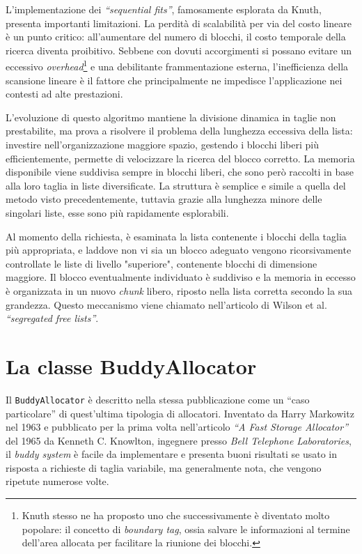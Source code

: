 L'implementazione dei \textit{“sequential fits”}, famosamente esplorata da Knuth, presenta importanti limitazioni. La perdità di scalabilità per via del costo lineare è un punto critico: all’aumentare del numero di blocchi, il costo temporale della ricerca diventa proibitivo. Sebbene con dovuti accorgimenti si possano evitare un eccessivo \textit{overhead}\footnote{Knuth stesso ne ha proposto uno che successivamente è diventato molto popolare: il concetto di \textit{boundary tag}, ossia salvare le informazioni al termine dell'area allocata per facilitare la riunione dei blocchi.} e una debilitante frammentazione esterna, l’inefficienza della scansione lineare è il fattore che principalmente ne impedisce l'applicazione nei contesti ad alte prestazioni.

L’evoluzione di questo algoritmo mantiene la divisione dinamica in taglie non prestabilite, ma prova a risolvere il problema della lunghezza eccessiva della lista: investire nell’organizzazione maggiore spazio, gestendo i blocchi liberi più efficientemente, permette di velocizzare la ricerca del blocco corretto. La memoria disponibile viene suddivisa sempre in blocchi liberi, che sono però raccolti in base alla loro taglia in liste diversificate. La struttura è semplice e simile a quella del metodo visto precedentemente, tuttavia grazie alla lunghezza minore delle singolari liste, esse sono più rapidamente esplorabili.

Al momento della richiesta, è esaminata la lista contenente i blocchi della taglia più appropriata, e laddove non vi sia un blocco adeguato vengono ricorsivamente controllate le liste di livello "superiore", contenente blocchi di dimensione maggiore. Il blocco eventualmente individuato è suddiviso e la memoria in eccesso è organizzata in un nuovo \textit{chunk} libero, riposto nella lista corretta secondo la sua grandezza. Questo meccanismo viene chiamato nell’articolo di Wilson et al. \textit{“segregated free lists”}.


\section{La classe BuddyAllocator}
Il \texttt{BuddyAllocator} è descritto nella stessa pubblicazione come un “caso particolare” di quest'ultima tipologia di allocatori. Inventato da Harry Markowitz nel 1963 e pubblicato per la prima volta nell’articolo \textit{“A Fast Storage Allocator”}\cite{knowlton1965} del 1965 da Kenneth C. Knowlton, ingegnere presso \textit{Bell Telephone Laboratories}, il \textit{buddy system} è facile da implementare e presenta buoni risultati se usato in risposta a richieste di taglia variabile, ma generalmente nota, che vengono ripetute numerose volte.
 

